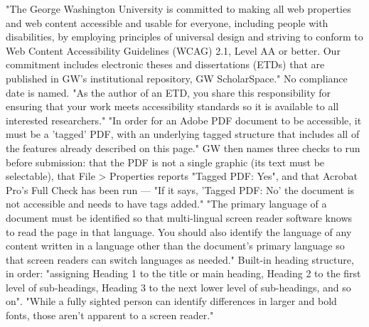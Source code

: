 %
\thesisrequiretagging
\thesisrequiredocumentlanguage
{}
	{"The George Washington University is committed to making all web properties
	 and web content accessible and usable for everyone, including people with
	 disabilities, by employing principles of universal design and striving to
	 conform to Web Content Accessibility Guidelines (WCAG) 2.1, Level AA or
	 better. Our commitment includes electronic theses and dissertations (ETDs)
	 that are published in GW's institutional repository, GW ScholarSpace." No
	 compliance date is named.}
	{"As the author of an ETD, you share this responsibility for ensuring that
	 your work meets accessibility standards so it is available to all
	 interested researchers."}
	{"In order for an Adobe PDF document to be accessible, it must be a 'tagged'
	 PDF, with an underlying tagged structure that includes all of the features
	 already described on this page." GW then names three checks to run before
	 submission: that the PDF is not a single graphic (its text must be
	 selectable), that File > Properties reports "Tagged PDF: Yes", and that
	 Acrobat Pro's Full Check has been run — "If it says, 'Tagged PDF: No' the
	 document is not accessible and needs to have tags added."}
	{"The primary language of a document must be identified so that
	 multi-lingual screen reader software knows to read the page in that
	 language. You should also identify the language of any content written in a
	 language other than the document's primary language so that screen readers
	 can switch languages as needed."}
	{Built-in heading structure, in order: "assigning Heading 1 to the title or
	 main heading, Heading 2 to the first level of sub-headings, Heading 3 to the
	 next lower level of sub-headings, and so on". "While a fully sighted person
	 can identify differences in larger and bold fonts, those aren't apparent to
	 a screen reader."}
